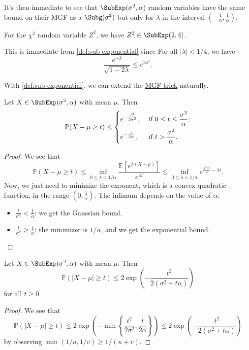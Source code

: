 It's then immediate to see that \(\SubExp(\sigma^2,\alpha)\) random variables have the same bound on their MGF as a \(\Subg(\sigma^2)\) but only for \(\lambda\) in the interval \((-\frac{1}{\alpha},\frac{1}{\alpha})\).

\begin{eg}
  For the \(\chi ^2\) random variable \(Z^2\), we have \(Z^2 \in \SubExp(2, 4) \).
\end{eg}
\begin{explanation}
  This is immediate from \autoref{def:sub-exponential} since For all \(\vert \lambda \vert < 1 / 4\), we have
  \[
    \frac{e^{-\lambda }}{\sqrt{1 - 2 \lambda } } \leq e^{2 \lambda ^{2} }.
  \]
\end{explanation}

With \autoref{def:sub-exponential}, we can extend the \hyperref[lma:MGF-trick]{MGF trick} naturally.

\begin{lemma}\label{lma:MGF-trick-SubExp}
  Let \(X \in \SubExp(\sigma ^{2} , \alpha ) \) with mean \(\mu \). Then
  \[
    \mathbb{P} (X - \mu \geq t) \leq
    \begin{dcases}
      e^{- \frac{t^2}{2 \sigma ^{2} }}, & \text{ if } 0 \leq t \leq \frac{\sigma ^{2}}{\alpha } ; \\
      e^{- \frac{t}{2\alpha }},         & \text{ if } t > \frac{\sigma ^{2} }{\alpha }.
    \end{dcases}
  \]
\end{lemma}
\begin{proof}
  We see that
  \[
    \mathbb{P} (X- \mu \geq t)
    \leq \inf _{0 \leq \lambda < 1 / \alpha } \frac{\mathbb{E}_{}\left[e^{\lambda (X - \mu )} \right] }{e^{\lambda t}}
    \leq \inf _{0 \leq \lambda < 1 / \alpha } e^{\frac{\lambda ^{2} \sigma ^{2} }{2} - \lambda t}.
  \]
  Now, we just need to minimize the exponent, which is a convex quadratic function, in the range \((0,\frac{1}{\alpha})\). The infimum depends on the value of \(\alpha\):
  \begin{itemize}
    \item \(\frac{t}{\sigma ^{2} } < \frac{1}{\alpha }\): we get the Gaussian bound.
    \item \(\frac{t}{\sigma ^{2} } \geq \frac{1}{\alpha }\): the minimizer is \(1 / \alpha \), and we get the exponential bound.
  \end{itemize}
\end{proof}

\begin{corollary}\label{col:MGF-trick-SubExp}
  Let \(X \in \SubExp(\sigma ^{2} , \alpha ) \) with mean \(\mu \). Then
  \[
    \mathbb{P} (\vert X - \mu  \vert \geq t) \leq 2 \exp \left( - \frac{t^2}{2(\sigma ^{2} + t \alpha )} \right)
  \]
  for all \(t \geq 0\).
\end{corollary}
\begin{proof}
  We see that
  \[
    \mathbb{P} (\vert X - \mu  \vert \geq t)
    \leq 2 \exp \left( - \min \left\{ \frac{t^2}{2 \sigma ^{2} }, \frac{t}{2\alpha } \right\}  \right)
    \leq 2 \exp \left( - \frac{t^2}{2(\sigma ^{2} + t \alpha )} \right)
  \]
  by observing \(\min (1 / u, 1 / v ) \geq 1 / (u + v)\).
\end{proof}

